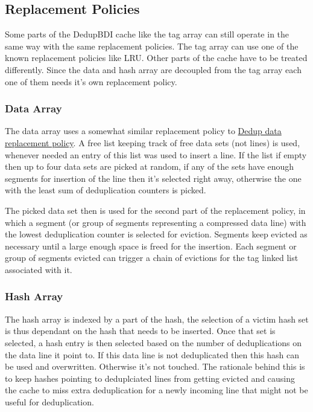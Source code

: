 \subsection{Replacement Policies}
\label{ssec:Replacement Policies}
Some parts of the DedupBDI cache like the tag array can still operate in the same way with the same replacement policies. The tag array can use one of the known replacement policies like LRU. Other parts of the cache have to be treated differently. Since the data and hash array are decoupled from the tag array each one of them needs it's own replacement policy.
\subsubsection{Data Array}
\label{sssec:DedupBDIDataRepl}
The data array uses a somewhat similar replacement policy to \hyperref[sssec:DedupDataRepl]{Dedup data replacement policy}. A free list keeping track of free data sets (not lines) is used, whenever needed an entry of this list was used to insert a line. If the list if empty then up to four data sets are picked at random, if any of the sets have enough segments for insertion of the line then it's selected right away, otherwise the one with the least sum of deduplication counters is picked.\par
The picked data set then is used for the second part of the replacement policy, in which a segment (or group of segments representing a compressed data line) with the lowest deduplication counter is selected for eviction. Segments keep evicted as necessary until a large enough space is freed for the insertion. Each segment or group of segments evicted can trigger a chain of evictions for the tag linked list associated with it.
\subsubsection{Hash Array}
\label{sssec:DedupBDIHashRepl}
The hash array is indexed by a part of the hash, the selection of a victim hash set is thus dependant on the hash that needs to be inserted. Once that set is selected, a hash entry is then selected based on the number of deduplications on the data line it point to. If this data line is not deduplicated then this hash can be used and overwritten. Otherwise it's not touched. The rationale behind this is to keep hashes pointing to deduplciated lines from getting evicted and causing the cache to miss extra deduplication for a newly incoming line that might not be useful for deduplication.

